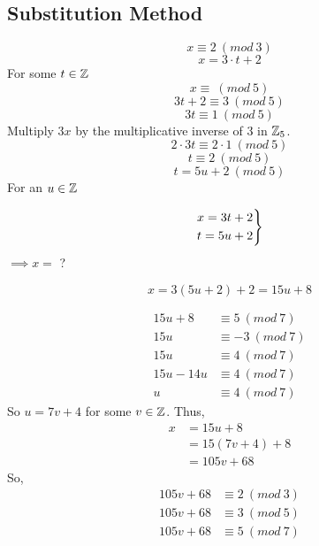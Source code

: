 \documentclass[openany]{report}
\begin{document}
\subsection{Substitution Method}
$$x \equiv 2 \ (mod \ 3)$$
$$x = 3 \cdot t + 2$$
For some $t \in \mathbb{Z}$
$$x \equiv \ (mod \ 5)$$
$$3t + 2 \equiv 3 \ (mod \ 5)$$
$$3t \equiv 1 \ (mod \ 5)$$
Multiply $3x$ by the multiplicative inverse of $3$ in $\mathbb{Z}_5$.
$$2 \cdot 3t \equiv 2 \cdot 1 \ (mod \ 5)$$
$$t \equiv 2 \ (mod \ 5)$$
$$t = 5u + 2 \ (mod \ 5)$$ 
For an $u \in \mathbb{Z}$\\
\begin{center}
    \[\begin{rcases}
$$x = 3t + 2$$\\
$$t = 5u + 2$$
\end{rcases}\] $\implies x =$ ?
\end{center}
$$x = 3(5u +2) +2 = 15u + 8$$

\begin{align*}
15u + 8 &\equiv 5 \ (mod \ 7)\\
15u &\equiv -3 \ (mod \ 7)\\ 
15u &\equiv 4 \ (mod \ 7) \\
15u - 14u &\equiv 4 \ (mod \ 7)\\
u &\equiv 4 \ (mod \ 7)
\end{align*}
So $u = 7v + 4$ for some $v \in \mathbb{Z}$. Thus,
\begin{align*}
    x &= 15u + 8\\
    &= 15(7v + 4) + 8\\
    &= 105v + 68
\end{align*}
So,
\begin{align*}
    105v + 68 &\equiv 2 \ (mod \ 3)\\
    105v + 68 &\equiv 3\ (mod \ 5)\\
    105v + 68 &\equiv 5\ (mod \ 7)\\
\end{align*}
\end{document}
